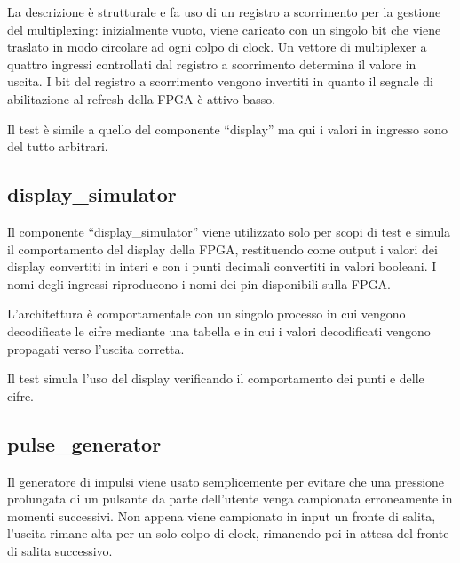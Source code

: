 \documentclass [11pt,a4paper,oneside]{article}
\begin{document}


La descrizione è strutturale e fa uso di un registro a scorrimento
per la gestione del multiplexing: inizialmente vuoto, viene caricato
con un singolo bit che viene traslato in modo circolare ad ogni colpo
di clock. Un vettore di multiplexer a quattro ingressi controllati
dal registro a scorrimento determina il valore in uscita. I bit
del registro a scorrimento vengono invertiti in quanto il segnale
di abilitazione al refresh della FPGA è attivo basso.



Il test è simile a quello del componente ``display'' ma qui i valori in
ingresso sono del tutto arbitrari.

\subsection{display\_simulator}

Il componente ``display\_simulator'' viene utilizzato solo per scopi di
test e simula il comportamento del display della FPGA, restituendo come
output i valori dei display convertiti in interi e con i punti decimali
convertiti in valori booleani. I nomi degli ingressi riproducono i nomi
dei pin disponibili sulla FPGA.



L'architettura è comportamentale con un singolo processo in cui vengono
decodificate le cifre mediante una tabella e in cui i valori decodificati
vengono propagati verso l'uscita corretta.



Il test simula l'uso del display verificando il comportamento dei punti e
delle cifre.

\subsection{pulse\_generator}

Il generatore di impulsi viene usato semplicemente per evitare che una
pressione prolungata di un pulsante da parte dell'utente venga
campionata erroneamente in momenti successivi. Non appena viene
campionato in input un fronte di salita, l'uscita rimane alta per un solo
colpo di clock, rimanendo poi in attesa del fronte di salita successivo.
\end{document}
